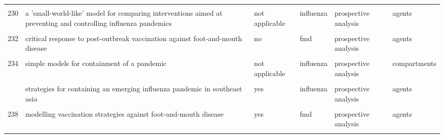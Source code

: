 \documentclass[
]{article}
\begin{document}
\begin{landscape}
\begin{longtable}{l>{\raggedright\arraybackslash}p{3.3cm}l>{\raggedright\arraybackslash}p{3.3cm}>{\raggedright\arraybackslash}p{2cm}l}
\cellcolor{gray!6}{229} & \cellcolor{gray!6}{vaccinating in disease-free regions: a vaccine model with application to yellow fever} & \cellcolor{gray!6}{yes} & \cellcolor{gray!6}{yellow fever} & \cellcolor{gray!6}{prospective analysis} & \cellcolor{gray!6}{compartments}\\
230 & a 'small-world-like' model for comparing interventions aimed at preventing and controlling influenza pandemics & not applicable & influenza & prospective analysis & agents\\
\addlinespace
\cellcolor{gray!6}{231} & \cellcolor{gray!6}{containing pandemic influenza with antiviral agents: analytical commentary} & \cellcolor{gray!6}{yes} & \cellcolor{gray!6}{influenza} & \cellcolor{gray!6}{prospective analysis} & \cellcolor{gray!6}{compartments}\\
232 & critical response to post-outbreak vaccination against foot-and-mouth disease & no & fmd & prospective analysis & agents\\
\cellcolor{gray!6}{233} & \cellcolor{gray!6}{mitigation strategies for pandemic influenza in the united states} & \cellcolor{gray!6}{yes} & \cellcolor{gray!6}{influenza} & \cellcolor{gray!6}{prospective analysis} & \cellcolor{gray!6}{agents}\\
234 & simple models for containment of a pandemic & not applicable & influenza & prospective analysis & compartments\\
\cellcolor{gray!6}{235} & \cellcolor{gray!6}{statistical inference in a stochastic epidemic seir model with control intervention: ebola as a case study} & \cellcolor{gray!6}{no} & \cellcolor{gray!6}{ebola} & \cellcolor{gray!6}{retrospective analysis} & \cellcolor{gray!6}{compartments}\\
\addlinespace
236 & strategies for containing an emerging influenza pandemic in southeast asia & yes & influenza & prospective analysis & agents\\
\cellcolor{gray!6}{237} & \cellcolor{gray!6}{modeling alternative mitigation strategies for a hypothetical outbreak of foot-and-mouth disease in the united states} & \cellcolor{gray!6}{yes} & \cellcolor{gray!6}{fmd} & \cellcolor{gray!6}{prospective analysis} & \cellcolor{gray!6}{agents}\\
238 & modelling vaccination strategies against foot-and-mouth disease & yes & fmd & prospective analysis & agents\\
\cellcolor{gray!6}{239} & \cellcolor{gray!6}{a decision-tree to optimise control measures during the early stage of a foot-and-mouth disease epidemic} & \cellcolor{gray!6}{yes} & \cellcolor{gray!6}{fmd} & \cellcolor{gray!6}{prospective analysis} & \cellcolor{gray!6}{compartments}\\

\end{longtable}
\end{landscape}
\end{document}
